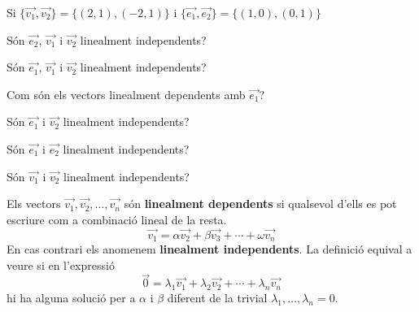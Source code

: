 \Exercise Si $\{\overrightarrow{v_1},\overrightarrow{v_2}\} = \{ (2,1),(-2,1) \}$ i $\{\overrightarrow{e_1},\overrightarrow{e_2}\} = \{ (1,0),(0,1) \}$
\begin{llista}
  \item Són $\overrightarrow{e_2}$, $\overrightarrow{v_1}$ i $\overrightarrow{v_2}$ linealment independents?
  \item Són $\overrightarrow{e_1}$, $\overrightarrow{v_1}$ i $\overrightarrow{v_2}$ linealment independents?
  \item Com són els vectors linealment dependents amb $\overrightarrow{e_1}$?
  \item Són $\overrightarrow{e_1}$ i $\overrightarrow{v_2}$ linealment independents?
  \item Són $\overrightarrow{e_1}$ i $\overrightarrow{e_2}$ linealment independents?
  \item Són $\overrightarrow{v_1}$ i $\overrightarrow{v_2}$ linealment independents?
\end{llista}

\Answer Els vectors $\overrightarrow{v_1},\overrightarrow{v_2}, \ldots, \overrightarrow{v_n}$ són {\bf linealment dependents} si qualsevol d'ells es pot escriure com a  combinació lineal de la resta.    
\[\vec{v_1} = \alpha \overrightarrow{v_2} + \beta \overrightarrow{v_3} + \cdots + \omega \overrightarrow{v_n}\]
En cas contrari els anomenem {\bf linealment independents}. La definició equival a veure si en l'expressió
\[\vec{0} = \lambda_1 \overrightarrow{v_1} + \lambda_2 \overrightarrow{v_2} + \cdots + \lambda_n \overrightarrow{v_n}\]
hi ha alguna solució per a $\alpha$ i $\beta$ diferent de la trivial $\lambda_1,\ldots,\lambda_n=0$.


